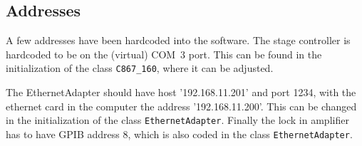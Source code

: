 \subsection{Addresses}
A few addresses have been hardcoded into the software. The stage controller is hardcoded to be on the (virtual) COM~3 port. This can be found in the initialization of the class \verb!C867_160!, where it can be adjusted.

The EthernetAdapter should have host '192.168.11.201' and port 1234, with the ethernet card in the computer the address '192.168.11.200'. This can be changed in the initialization of the class \verb!EthernetAdapter!. Finally the lock in amplifier has to have GPIB address 8, which is also coded in the class \verb!EthernetAdapter!.


